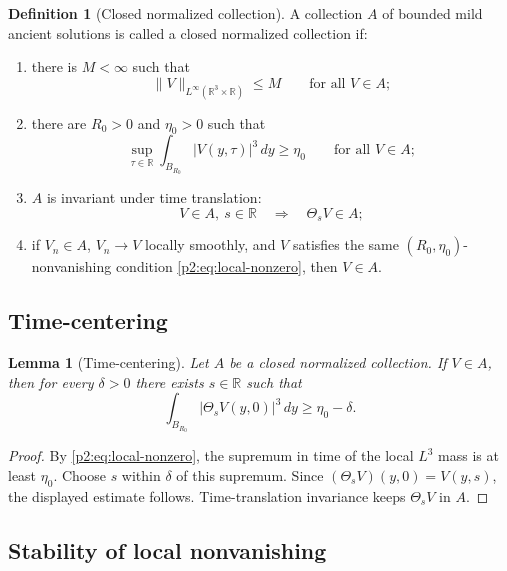 \documentclass[11pt]{amsart}
\theoremstyle{plain}
\newtheorem{lemma}[lemma]{Lemma}
\theoremstyle{definition}
\newtheorem{definition}[definition]{Definition}
\theoremstyle{remark}
\numberwithin{equation}{section}
\newcommand{\R}{\mathbb R}
\begin{document}
\begin{definition}[Closed normalized collection]\label{p2:def:closed-normalized}
A collection \(A\) of bounded mild ancient solutions is called a closed
normalized collection if:
\begin{enumerate}[label=\textup{(\roman*)}]
\item there is \(M<\infty\) such that
\[
   \|V\|_{L^\infty(\R^3\times\R)}\le M
   \qquad\text{for all }V\in A;
\]
\item there are \(R_0>0\) and \(\eta_0>0\) such that
\begin{equation}\label{p2:eq:local-nonzero}
   \sup_{\tau\in\R}
   \int_{B_{R_0}}|V(y,\tau)|^3\,dy
   \ge \eta_0
   \qquad\text{for all }V\in A;
\end{equation}
\item \(A\) is invariant under time translation:
\[
   V\in A,\ s\in\R
   \quad\Longrightarrow\quad
   \Theta_sV\in A;
\]
\item if \(V_n\in A\), \(V_n\to V\) locally smoothly, and \(V\) satisfies the
same \((R_0,\eta_0)\)-nonvanishing condition \eqref{p2:eq:local-nonzero}, then
\(V\in A\).
\end{enumerate}
\end{definition}

\subsection{Time-centering}

\begin{lemma}[Time-centering]\label{p2:lem:time-centering}
Let \(A\) be a closed normalized collection.  If \(V\in A\), then for every
\(\delta>0\) there exists \(s\in\R\) such that
\[
   \int_{B_{R_0}}|\Theta_sV(y,0)|^3\,dy
   \ge \eta_0-\delta.
\]
\end{lemma}

\begin{proof}
By \eqref{p2:eq:local-nonzero}, the supremum in time of the local \(L^3\) mass is
at least \(\eta_0\).  Choose \(s\) within \(\delta\) of this supremum.  Since
\((\Theta_sV)(y,0)=V(y,s)\), the displayed estimate follows.  Time-translation
invariance keeps \(\Theta_sV\) in \(A\).
\end{proof}

\subsection{Stability of local nonvanishing}
\end{document}
